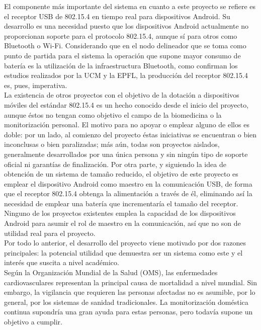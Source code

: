 	El componente más importante del sistema en cuanto a este proyecto se refiere es el receptor USB de 802.15.4 en tiempo real para dispositivos Android. Su desarrollo es una necesidad puesto que los dispositivos Android actualmente no proporcionan soporte para el protocolo 802.15.4, aunque sí para otros como Bluetooth o Wi-Fi. Considerando que en el nodo delineador que se toma como punto de partida para el sistema la operación que supone mayor consumo de batería es la utilización de la infraestructura Bluetooth, como confirman los estudios realizados por la UCM y la EPFL, la producción del receptor 802.15.4 es, pues, imperativa.\\

	La existencia de otros proyectos con el objetivo de la dotación a dispositivos móviles del estándar 802.15.4 es un hecho conocido desde el inicio del proyecto, aunque éstos no tengan como objetivo el campo de la biomedicina o la monitorización personal. El motivo para no apoyar o emplear alguno de ellos es doble: por un lado, al comienzo del proyecto éstas iniciativas se encuentran o bien inconclusas o bien paralizadas; más aún, todas son proyectos aislados, generalmente desarrollados por una única persona y sin ningún tipo de soporte oficial ni garantías de finalización. Por otra parte, y siguiendo la idea de obtención de un sistema de tamaño reducido, el objetivo de este proyecto es emplear el dispositivo Android como maestro en la comunicación USB, de forma que el receptor 802.15.4 obtenga la alimentación a través de él, eliminando así la necesidad de emplear una batería que incrementaría el tamaño del receptor. Ninguno de los proyectos existentes emplea la capacidad de los dispositivos Android para asumir el rol de maestro en la comunicación, así que no son de utilidad real para el proyecto.\\

	Por todo lo anterior, el desarrollo del proyecto viene motivado por dos razones principales: la 
	potencial utilidad que demuestra ser un sistema como este y el interés que suscita a nivel
	académico.\\

	Según la Organización Mundial de la Salud (OMS), las enfermedades cardiovasculares representan la
	principal causa de mortalidad a nivel mundial. Sin embargo, la vigilancia que requieren las
	personas afectadas no es asumible, por lo general, por los sistemas de sanidad tradicionales. La
	monitorización doméstica continua supondría una gran ayuda para estas personas, pero todavía
	supone un objetivo a cumplir.\\

